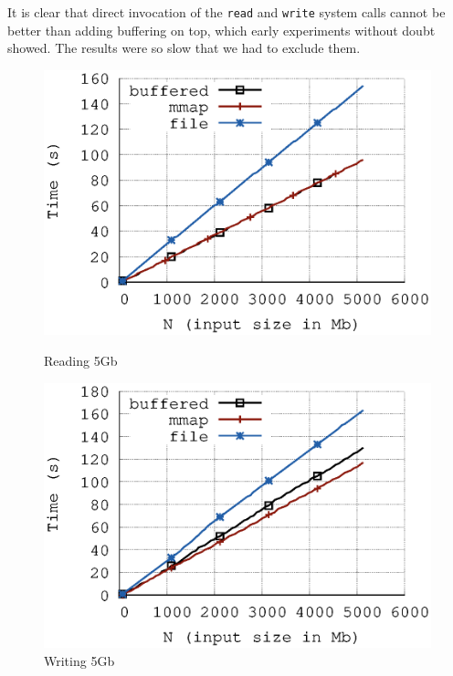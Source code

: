 \documentclass[twoside,11pt,openright]{report}
\begin{document}
It is clear that direct invocation of the \texttt{read} and \texttt{write} system calls cannot be better than adding buffering on top, which early experiments without doubt showed. The results were so slow that we had to exclude them.
\begin{figure}[]
\centering
\begin{minipage}{.5\textwidth}
  \centering
  \includegraphics[width=\linewidth]{../src/experiments/stream_input_speed_experiment_results/2016-04-23.16_00_16/time}
  \caption{Reading 5Gb}
  \label{fig:stream_input_speed}
\end{minipage}%
\begin{minipage}{.5\textwidth}
  \centering
  \includegraphics[width=\linewidth]{../src/experiments/stream_output_speed_experiment_results/2016-04-23.16_07_40/time}
  \caption{Writing 5Gb}
  \label{fig:stream_output_speed}
\end{minipage}
\end{figure}
\end{document}
